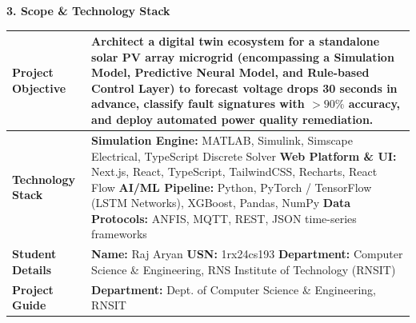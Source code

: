 \documentclass[11pt,a4paper]{article}
\newcommand{\sectionheader}[1]{\vspace{10pt}\noindent\Large\textbf{#1}\vspace{4pt}\normalsize}
\newcommand{\tablehead}[1]{\textbf{#1}}
\begin{document}
\vspace{-5pt}

\sectionheader{3. Scope \& Technology Stack}
\begin{table}[H]
    \renewcommand{\arraystretch}{1.4}
    \begin{tabularx}{\textwidth}{|l|X|}
    \hline
    \tablehead{Project Objective} & Architect a digital twin ecosystem for a standalone solar PV array microgrid (encompassing a Simulation Model, Predictive Neural Model, and Rule-based Control Layer) to forecast voltage drops 30 seconds in advance, classify fault signatures with $>90\%$ accuracy, and deploy automated power quality remediation. \\
    \hline
    \tablehead{Technology Stack} & 
    \textbf{Simulation Engine:} MATLAB, Simulink, Simscape Electrical, TypeScript Discrete Solver \newline
    \textbf{Web Platform \& UI:} Next.js, React, TypeScript, TailwindCSS, Recharts, React Flow \newline
    \textbf{AI/ML Pipeline:} Python, PyTorch / TensorFlow (LSTM Networks), XGBoost, Pandas, NumPy \newline
    \textbf{Data Protocols:} ANFIS, MQTT, REST, JSON time-series frameworks \\
    \hline
    \tablehead{Student Details} & 
    \textbf{Name:} Raj Aryan \newline
    \textbf{USN:} 1rx24cs193 \newline
    \textbf{Department:} Computer Science \& Engineering, RNS Institute of Technology (RNSIT) \\
    \hline
    \tablehead{Project Guide} & 
    \textbf{Department:} Dept. of Computer Science \& Engineering, RNSIT \\
    \hline
    \end{tabularx}
\end{table}

\vspace{-5pt}
\end{document}
